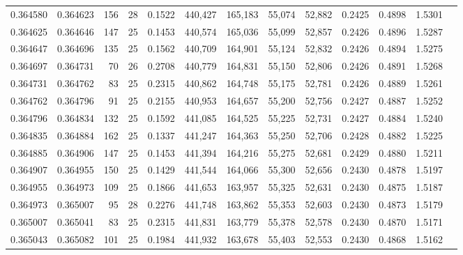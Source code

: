 \begin{tabular}{rrrrrrrrrrrrr}
0.364580 & 0.364623 &   156 &  28 &                                     0.1522 & 440,427 & 165,183 &  55,074 &  52,882 & 0.2425 & 0.4898 & 1.5301 \\
0.364625 & 0.364646 &   147 &  25 &                                     0.1453 & 440,574 & 165,036 &  55,099 &  52,857 & 0.2426 & 0.4896 & 1.5287 \\
0.364647 & 0.364696 &   135 &  25 &                                     0.1562 & 440,709 & 164,901 &  55,124 &  52,832 & 0.2426 & 0.4894 & 1.5275 \\
0.364697 & 0.364731 &    70 &  26 &                                     0.2708 & 440,779 & 164,831 &  55,150 &  52,806 & 0.2426 & 0.4891 & 1.5268 \\
0.364731 & 0.364762 &    83 &  25 &                                     0.2315 & 440,862 & 164,748 &  55,175 &  52,781 & 0.2426 & 0.4889 & 1.5261 \\
0.364762 & 0.364796 &    91 &  25 &                                     0.2155 & 440,953 & 164,657 &  55,200 &  52,756 & 0.2427 & 0.4887 & 1.5252 \\
0.364796 & 0.364834 &   132 &  25 &                                     0.1592 & 441,085 & 164,525 &  55,225 &  52,731 & 0.2427 & 0.4884 & 1.5240 \\
0.364835 & 0.364884 &   162 &  25 &                                     0.1337 & 441,247 & 164,363 &  55,250 &  52,706 & 0.2428 & 0.4882 & 1.5225 \\
0.364885 & 0.364906 &   147 &  25 &                                     0.1453 & 441,394 & 164,216 &  55,275 &  52,681 & 0.2429 & 0.4880 & 1.5211 \\
0.364907 & 0.364955 &   150 &  25 &                                     0.1429 & 441,544 & 164,066 &  55,300 &  52,656 & 0.2430 & 0.4878 & 1.5197 \\
0.364955 & 0.364973 &   109 &  25 &                                     0.1866 & 441,653 & 163,957 &  55,325 &  52,631 & 0.2430 & 0.4875 & 1.5187 \\
0.364973 & 0.365007 &    95 &  28 &                                     0.2276 & 441,748 & 163,862 &  55,353 &  52,603 & 0.2430 & 0.4873 & 1.5179 \\
0.365007 & 0.365041 &    83 &  25 &                                     0.2315 & 441,831 & 163,779 &  55,378 &  52,578 & 0.2430 & 0.4870 & 1.5171 \\
0.365043 & 0.365082 &   101 &  25 &                                     0.1984 & 441,932 & 163,678 &  55,403 &  52,553 & 0.2430 & 0.4868 & 1.5162 \\

\end{tabular}

